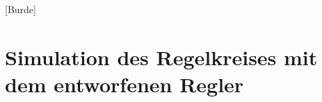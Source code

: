 
\newpage

[Burde]
\section{Simulation des Regelkreises mit dem entworfenen Regler} \label{Kapitel7}
